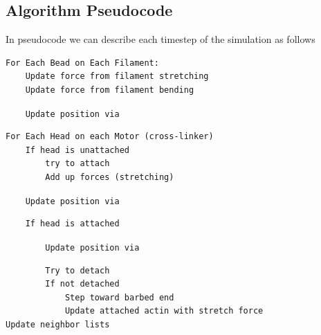\documentclass[12pt]{article}
\begin{document}
\subsection{Algorithm Pseudocode}
In pseudocode we can describe each timestep of the simulation as follows
\begin{verbatim}
For Each Bead on Each Filament:
    Update force from filament stretching
    Update force from filament bending\end{verbatim}
\verb|    Update position via | \begin{verbatim}
For Each Head on each Motor (cross-linker)
    If head is unattached
        try to attach
        Add up forces (stretching)\end{verbatim}
\verb|    Update position via | \begin{verbatim}
    If head is attached\end{verbatim}
\verb|        Update position via | \begin{verbatim}
        Try to detach
        If not detached 
            Step toward barbed end
            Update attached actin with stretch force
Update neighbor lists
\end{verbatim}
\end{document}
